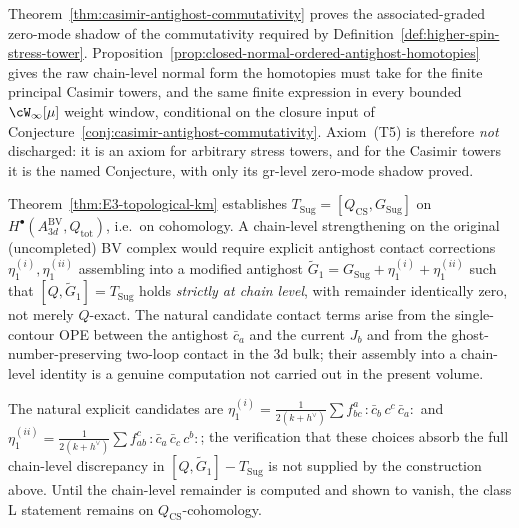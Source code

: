 \begin{remark}
\label{rem:frontier-antighost-BRST-commutativity-higher-spin}
Theorem~\ref{thm:casimir-antighost-commutativity} proves the
associated-graded zero-mode shadow of the commutativity required by
Definition~\ref{def:higher-spin-stress-tower}.
Proposition~\ref{prop:closed-normal-ordered-antighost-homotopies}
gives the raw chain-level normal form the homotopies must take for
the finite principal Casimir towers, and the same finite expression
in every bounded $\cW_\infty[\mu]$ weight window, conditional on the
closure input of
Conjecture~\ref{conj:casimir-antighost-commutativity}. Axiom~(T5) is
therefore \emph{not} discharged: it is an axiom for arbitrary
stress towers, and for the Casimir towers it is the named
Conjecture, with only its gr-level zero-mode shadow proved.
\end{remark}

\begin{remark}
\label{rem:frontier-class-L-strict-chain-level}
\label{frontier:class-L-strict-chain-level}%
Theorem~\textup{\ref{thm:E3-topological-km}} establishes
$T_{\mathrm{Sug}} = [Q_{\mathrm{CS}}, G_{\mathrm{Sug}}]$ on
$H^\bullet(A^{\mathrm{BV}}_{3d}, Q_{\mathrm{tot}})$, i.e.\ on
cohomology. A chain-level strengthening on the original (uncompleted)
BV complex would require explicit antighost contact corrections
$\eta_1^{(i)}, \eta_1^{(ii)}$ assembling into a modified antighost
$\tilde G_1 = G_{\mathrm{Sug}} + \eta_1^{(i)} + \eta_1^{(ii)}$ such
that $[Q, \tilde G_1] = T_{\mathrm{Sug}}$ holds
\emph{strictly at chain level}, with remainder identically zero, not
merely $Q$-exact. The natural candidate contact terms arise from the
single-contour OPE between the antighost $\bar c_a$ and the current
$J_b$ and from the ghost-number-preserving two-loop contact in the
$3$d bulk; their assembly into a chain-level identity is a genuine
computation not carried out in the present volume.

The natural explicit candidates are
$\eta_1^{(i)} = \tfrac{1}{2(k+h^\vee)}\sum f^a_{bc}\,
{:}\bar c_b\, c^c\, \bar c_a{:}$ and
$\eta_1^{(ii)} = \tfrac{1}{2(k+h^\vee)}\sum f_{ab}^c\,
{:}\bar c_a\, \bar c_c\, c^b{:}$; the verification that these choices
absorb the full chain-level discrepancy in
$[Q, \tilde G_1] - T_{\mathrm{Sug}}$ is not supplied by the construction
above. Until the chain-level remainder is computed and shown to vanish,
the class L statement remains on $Q_{\mathrm{CS}}$-cohomology.
\end{remark}

